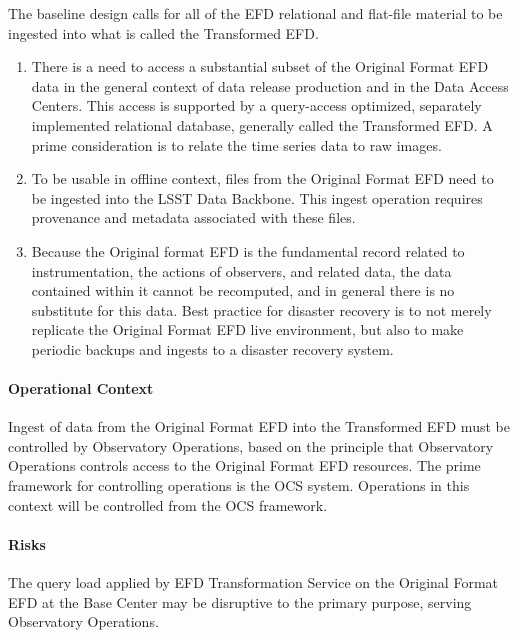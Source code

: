 The baseline design calls for all of the EFD relational
and flat-file material to be ingested into what is called the Transformed
EFD.

\begin{enumerate}

\item There is a need to access a substantial subset of the Original Format
EFD data in the general context of data release production and in the
Data Access Centers. This access is supported by a query-access
optimized, separately implemented relational database, generally
called the Transformed EFD. A prime consideration is to relate the
time series data to raw images.

\item To be usable in offline context, files from the Original Format EFD
need to be ingested into the LSST Data Backbone. This ingest operation
requires provenance and metadata associated with these files.

\item Because the Original format EFD is the fundamental record related to
instrumentation, the actions of observers, and related data, the data
contained within it cannot be recomputed, and in general there is no
substitute for this data. Best practice for disaster recovery is to
not merely replicate the Original Format EFD live environment, but also
to make periodic backups and ingests to a disaster recovery system.

\end{enumerate}

\paragraph{Operational Context}

Ingest of data from the Original Format EFD into the Transformed EFD
must be controlled by Observatory Operations, based on the principle
that Observatory Operations controls access to the Original Format EFD
resources. The prime framework for controlling operations is the OCS
system. Operations in this context will be controlled from the OCS
framework.

\paragraph{Risks}

The query load applied by EFD Transformation Service  on the Original Format
EFD at the Base Center may be disruptive to the primary purpose,
serving Observatory Operations.

